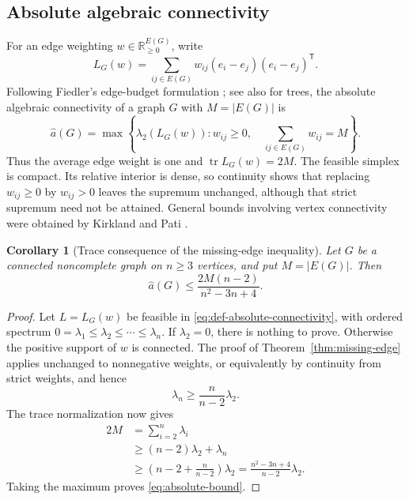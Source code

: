 \documentclass[11pt,reqno]{amsart}
\newtheorem{corollary}[theorem]{Corollary}
\theoremstyle{definition}
\theoremstyle{remark}
\newcommand{\R}{\mathbb R}
\begin{document}
\subsection{Absolute algebraic connectivity}
\label{subsec:absolute-connectivity}

For an edge weighting $w\in\R_{\ge0}^{E(G)}$, write
\[
  L_G(w)=\sum_{ij\in E(G)}
  w_{ij}(e_i-e_j)(e_i-e_j)^{\mathsf T}.
\]
Following Fiedler's edge-budget formulation \cite{Fiedler1989}; see also
\cite{Fiedler1990} for trees, the absolute algebraic connectivity of a graph
$G$ with $M=|E(G)|$ is
\begin{equation}\label{eq:def-absolute-connectivity}
  \widehat a(G)=
  \max\left\{
    \lambda_2(L_G(w)):
    w_{ij}\ge0,\quad
    \sum_{ij\in E(G)}w_{ij}=M
  \right\}.
\end{equation}
Thus the average edge weight is one and
$\operatorname{tr}L_G(w)=2M$.  The feasible simplex is compact.  Its relative
interior is dense, so continuity shows that replacing $w_{ij}\ge0$ by
$w_{ij}>0$ leaves the supremum unchanged, although that strict supremum need
not be attained.  General bounds involving vertex connectivity were obtained
by Kirkland and Pati \cite{KirklandPati2002}.

\begin{corollary}[Trace consequence of the missing-edge inequality]
\label{cor:absolute-connectivity}
Let $G$ be a connected noncomplete graph on $n\ge3$ vertices, and put
$M=|E(G)|$.  Then
\begin{equation}\label{eq:absolute-bound}
  \widehat a(G)
  \le
  \frac{2M(n-2)}{n^2-3n+4}.
\end{equation}
\end{corollary}

\begin{proof}
Let $L=L_G(w)$ be feasible in
\eqref{eq:def-absolute-connectivity}, with ordered spectrum
$0=\lambda_1\le\lambda_2\le\cdots\le\lambda_n$.  If $\lambda_2=0$, there is
nothing to prove.  Otherwise the positive support of $w$ is connected.  The
proof of Theorem~\ref{thm:missing-edge} applies unchanged to nonnegative
weights, or equivalently by continuity from strict weights, and hence
\[
  \lambda_n\ge\frac{n}{n-2}\lambda_2.
\]
The trace normalization now gives
\[
\begin{aligned}
  2M
  &=\sum_{i=2}^n\lambda_i\\
  &\ge(n-2)\lambda_2+\lambda_n\\
  &\ge\left(n-2+\frac{n}{n-2}\right)\lambda_2
   =\frac{n^2-3n+4}{n-2}\lambda_2.
\end{aligned}
\]
Taking the maximum proves \eqref{eq:absolute-bound}.
\end{proof}
\end{document}

